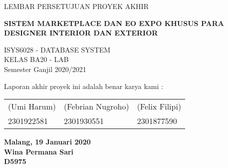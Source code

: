 \thispagestyle{plain}
\begin{center}
	\Large
	LEMBAR PERSETUJUAN PROYEK AKHIR
	
	\vspace{0.8cm}
	\textbf{SISTEM MARKETPLACE DAN EO EXPO KHUSUS PARA DESIGNER INTERIOR DAN EXTERIOR}
	
	\vspace{0.8cm}
	ISYS6028 - DATABASE SYSTEM \\
	KELAS BA20 - LAB \\
	
	\vspace{0.5cm}
	Semester Ganjil 2020/2021
\end{center}

\vspace{1.0cm}
\begin{flushleft}
	\normalsize
	Laporan akhir proyek ini adalah benar karya kami :
\end{flushleft}
\vspace{5.0cm}
\begin{center}
\begin{tabular}{p{2.1in}p{2.1in}p{2.1in} }
	(Umi Harum) & (Febrian Nugroho) & (Felix Filipi)\\
	2301922581 & 2301930551 & 2301877590\\
\end{tabular}
\end{center}
\begin{flushright}
	\vfill
	\textbf{Malang, 19 Januari 2020}\\
	\vspace{1.8cm}
	\textbf{Wina Permana Sari} \\
	\textbf{D5975}
\end{flushright}
